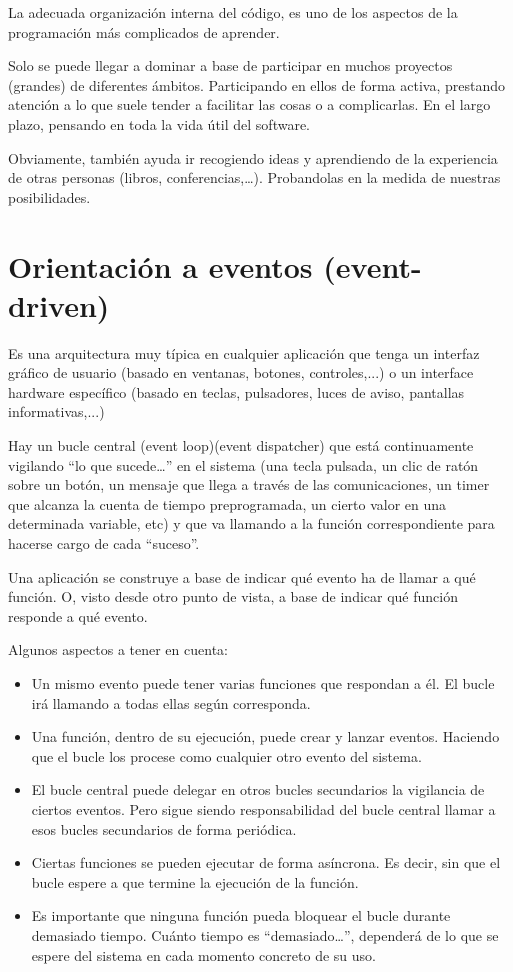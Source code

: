 \documentclass[spanish,12pt,a4paper,final,oneside]{book}
\begin{document}
La adecuada organización interna del código, es uno de los aspectos de la programación más complicados de aprender. 

Solo se puede llegar a dominar a base de participar en muchos proyectos (grandes) de diferentes ámbitos. Participando en ellos de forma activa, prestando atención a lo que suele tender a facilitar las cosas o a complicarlas. En el largo plazo, pensando en toda la vida útil del software.

Obviamente, también ayuda ir recogiendo ideas y aprendiendo de la experiencia de otras personas (libros, conferencias,\ldots). Probandolas en la medida de nuestras posibilidades.


\section{Orientación a eventos (event-driven)}\label{eventos}
Es una arquitectura muy típica en cualquier aplicación que tenga un interfaz gráfico de usuario (basado en ventanas, botones, controles,...) o un interface hardware específico (basado en teclas, pulsadores, luces de aviso, pantallas informativas,...)

Hay un bucle central (event loop)(event dispatcher) que está continuamente vigilando ``lo que sucede\ldots'' en el sistema (una tecla pulsada, un clic de ratón sobre un botón, un mensaje que llega a través de las comunicaciones, un timer que alcanza la cuenta de tiempo preprogramada, un cierto valor en una determinada variable, etc) y que va llamando a la función correspondiente para hacerse cargo de cada ``suceso''.

Una aplicación se construye a base de indicar qué evento ha de llamar a qué función. O, visto desde otro punto de vista, a base de indicar qué función responde a qué evento.

Algunos aspectos a tener en cuenta:
\begin{itemize}
\item Un mismo evento puede tener varias funciones que respondan a él. El bucle irá llamando a todas ellas según corresponda.
\item Una función, dentro de su ejecución, puede crear y lanzar eventos. Haciendo que el bucle los procese como cualquier otro evento del sistema.
\item El bucle central puede delegar en otros bucles secundarios la vigilancia de ciertos eventos. Pero sigue siendo responsabilidad del bucle central llamar a esos bucles secundarios de forma periódica.
\item Ciertas funciones se pueden ejecutar de forma asíncrona. Es decir, sin que el bucle espere a que termine la ejecución de la función.
\item Es importante que ninguna función pueda bloquear el bucle durante demasiado tiempo. Cuánto tiempo es ``demasiado\ldots'', dependerá de lo que se espere del sistema en cada momento concreto de su uso.
\end{itemize}
\end{document}

